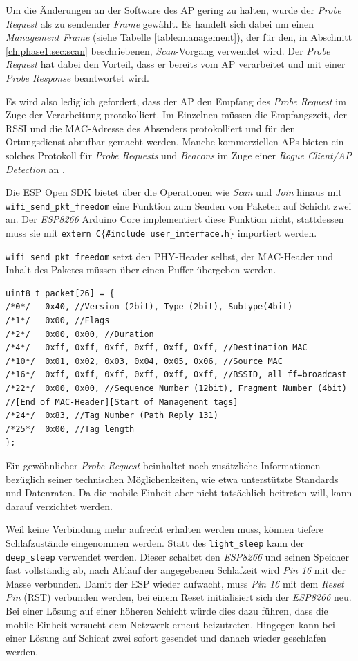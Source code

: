 Um die Änderungen an der Software des AP gering zu halten, wurde der \emph{Probe Request} als zu sendender \emph{Frame} gewählt.
Es handelt sich dabei um einen \emph{Management Frame} (siehe Tabelle \ref{table:management}), der für den, in Abschnitt \ref{ch:phase1:sec:scan} beschriebenen, \emph{Scan}-Vorgang verwendet wird.
Der \emph{Probe Request} hat dabei den Vorteil, dass er bereits vom AP verarbeitet und mit einer \emph{Probe Response} beantwortet wird. 

Es wird also lediglich gefordert, dass der AP den Empfang des \emph{Probe Request} im Zuge der Verarbeitung protokolliert. 
Im Einzelnen müssen die Empfangszeit, der RSSI und die MAC-Adresse des Absenders protokolliert und für den Ortungsdienst abrufbar gemacht werden. 
Manche kommerziellen APs bieten ein solches Protokoll für \emph{Probe Requests} und \emph{Beacons} im Zuge einer \textit{Rogue Client/AP Detection} an \cite{lancom2017rouge}.

Die ESP Open SDK bietet über die Operationen wie \emph{Scan} und \emph{Join} hinaus mit \texttt{wifi\_send\_pkt\_freedom} eine Funktion zum Senden von Paketen auf Schicht zwei an.
Der \emph{ESP8266} Arduino Core implementiert diese Funktion nicht, stattdessen muss sie mit \texttt{extern \dq C\dq $\lbrace$\#include \dq user\_interface.h\dq $\rbrace$} importiert werden. 

\texttt{wifi\_send\_pkt\_freedom} setzt den PHY-Header selbst, der MAC-Header und Inhalt des Paketes müssen über einen Puffer übergeben werden.
\begin{verbatim}
uint8_t packet[26] = { 
/*0*/ 	0x40, //Version (2bit), Type (2bit), Subtype(4bit)
/*1*/ 	0x00, //Flags 
/*2*/ 	0x00, 0x00, //Duration
/*4*/   0xff, 0xff, 0xff, 0xff, 0xff, 0xff, //Destination MAC
/*10*/  0x01, 0x02, 0x03, 0x04, 0x05, 0x06, //Source MAC
/*16*/  0xff, 0xff, 0xff, 0xff, 0xff, 0xff, //BSSID, all ff=broadcast
/*22*/  0x00, 0x00, //Sequence Number (12bit), Fragment Number (4bit) 
//[End of MAC-Header][Start of Management tags]
/*24*/  0x83, //Tag Number (Path Reply 131) 
/*25*/ 	0x00, //Tag length
}; 
\end{verbatim}
Ein gewöhnlicher \emph{Probe Request} beinhaltet noch zusätzliche Informationen bezüglich seiner technischen Möglichenkeiten, wie etwa unterstützte Standards und Datenraten. 
Da die mobile Einheit aber nicht tatsächlich beitreten will, kann darauf verzichtet werden. 

Weil keine Verbindung mehr aufrecht erhalten werden muss, können tiefere Schlafzustände eingenommen werden. 
Statt des \texttt{light\_sleep} kann der \texttt{deep\_sleep} verwendet werden.
Dieser schaltet den \emph{ESP8266} und seinen Speicher fast vollständig ab, nach Ablauf der angegebenen Schlafzeit wird \emph{Pin 16} mit der Masse verbunden.
Damit der ESP wieder aufwacht, muss \emph{Pin 16} mit dem \emph{Reset Pin} (RST) verbunden werden, bei einem Reset initialisiert sich der \emph{ESP8266} neu.
Bei einer Lösung auf einer höheren Schicht würde dies dazu führen, dass die mobile Einheit versucht dem Netzwerk erneut beizutreten. 
Hingegen kann bei einer Lösung auf Schicht zwei sofort gesendet und danach wieder geschlafen werden.

